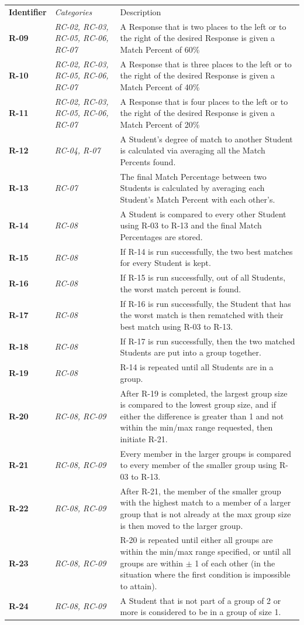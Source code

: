 \documentclass[12pt,letterpaper]{article}
\begin{document}
\begin{center}
    \begin{tabu} to 
	    \tableheader{}Identifier & Categories & Description\\
		R-09 & RC-02, RC-03, RC-05, RC-06, RC-07 & A Response that is two places to the left or to the right of the desired Response is given a Match Percent of 60\%\\
		R-10 & RC-02, RC-03, RC-05, RC-06, RC-07 & A Response that is three places to the left or to the right of the desired Response is given a Match Percent of 40\%\\
		R-11 & RC-02, RC-03, RC-05, RC-06, RC-07 & A Response that is four places to the left or to the right of the desired Response is given a Match Percent of 20\%\\
		R-12 & RC-04, R-07 & A Student's degree of match to another Student is calculated via averaging all the Match Percents found. \\
		R-13 & RC-07 & The final Match Percentage between two Students is calculated by averaging each Student's Match Percent with each other's.\\
		R-14 & RC-08 & A Student is compared to every other Student using R-03 to R-13 and the final Match Percentages are stored.\\
		R-15 & RC-08 & If R-14 is run successfully, the two best matches for every Student is kept.\\
		R-16 & RC-08 & If R-15 is run successfully, out of all Students, the worst match percent is found.\\
		R-17 & RC-08 & If R-16 is run successfully, the Student that has the worst match is then rematched with their best match using R-03 to R-13.\\
		R-18 & RC-08 & If R-17 is run successfully, then the two matched Students are put into a group together.\\
		R-19 & RC-08 & R-14 is repeated until all Students are in a group.\\
		R-20 & RC-08, RC-09 & After R-19 is completed, the largest group size is compared to the lowest group size, and if either the difference is greater than 1 and not within the min/max range requested, then initiate R-21.\\
		R-21 & RC-08, RC-09 & Every member in the larger groups is compared to every member of the smaller group using R-03 to R-13. \\
		R-22 & RC-08, RC-09 & After R-21, the member of the smaller group with the highest match to a member of a larger group that is not already at the max group size is then moved to the larger group.\\
		R-23 & RC-08, RC-09 & R-20 is repeated until either all groups are within the min/max range specified, or until all groups are within $\pm$ 1 of each other (in the situation where the first condition is impossible to attain).\\
		R-24 & RC-08, RC-09 & A Student that is not part of a group of 2 or more is considered to be in a group of size 1.
    \end{tabu}
\end{center}
\end{document}
